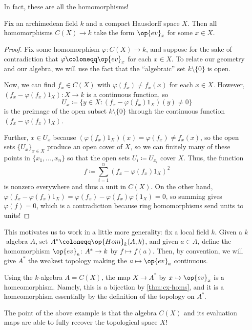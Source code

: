 \documentclass[../notes.tex]{subfiles}
\begin{document}
In fact, these are all the homomorphisms!
\begin{theorem} \label{thm:cx-homs}
	Fix an archimedean field $k$ and a compact Hausdorff space $X$. Then all homomorphisms $C(X)\to k$ take the form $\op{ev}_x$ for some $x\in X$.
\end{theorem}
\begin{proof}
	Fix some homomorphism $\varphi\colon C(X)\to k$, and suppose for the sake of contradiction that $\varphi\coloneqq\op{ev}_x$ for each $x\in X$. To relate our geometry and our algebra, we will use the fact that the ``algebraic'' set $k\setminus\{0\}$ is open.
	
	Now, we can find $f_x\in C(X)$ with $\varphi(f_x)\ne f_x(x)$ for each $x\in X$. However, $(f_x-\varphi(f_x)1_X)\colon X\to k$ is a continuous function, so
	\[U_x\coloneqq\{y\in X:(f_x-\varphi(f_x)1_X)(y)\ne0\}\]
	is the preimage of the open subset $k\setminus\{0\}$ through the continuous function $(f_x-\varphi(f_x)1_X)$.
	
	Further, $x\in U_x$ because $(\varphi(f_x)1_X)(x)=\varphi(f_x)\ne f_x(x)$, so the open sets $\{U_x\}_{x\in X}$ produce an open cover of $X$, so we can finitely many of these points in $\{x_1,\ldots,x_n\}$ so that the open sets $U_i\coloneqq U_{x_i}$ cover $X$. Thus, the function
	\[f\coloneqq\sum_{i=1}^n(f_x-\varphi(f_x)1_X)^2\]
	is nonzero everywhere and thus a unit in $C(X)$. On the other hand, $\varphi(f_x-\varphi(f_x)1_X)=\varphi(f_x)-\varphi(f_x)\varphi(1_X)=0$, so summing gives $\varphi(f)=0$, which is a contradiction because ring homomorphisms send units to units!
\end{proof}
This motivates us to work in a little more generality: fix a local field $k$. Given a $k$-algebra $A$, set $A^*\coloneqq\op{Hom}_k(A,k)$, and given $a\in A$, define the homomorphism $\op{ev}_a\colon A^*\to k$ by $f\mapsto f(a)$. Then, by convention, we will give $A^*$ the weakest topology making the $a\mapsto\op{ev}_a$ continuous.
\begin{example}
	Using the $k$-algebra $A=C(X)$, the map $X\to A^*$ by $x\mapsto\op{ev}_x$ is a homeomorphism. Namely, this is a bijection by \autoref{thm:cx-homs}, and it is a homeomorphism essentially by the definition of the topology on $A^*$.
\end{example}
The point of the above example is that the algebra $C(X)$ and its evaluation maps are able to fully recover the topological space $X$!
\end{document}
